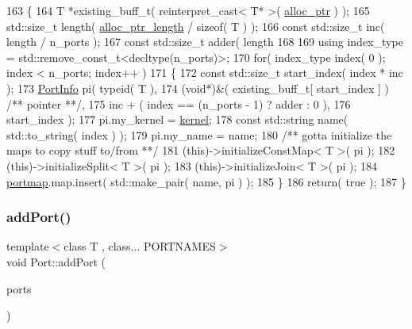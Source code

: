 \begin{DoxyCode}
163    \{
164       T *existing\_buff\_t( reinterpret\_cast< T* >( \hyperlink{class_port_a78bf16e68f1dd5312f37b4e2806a9cf8}{alloc\_ptr} ) );
165       std::size\_t length( \hyperlink{class_port_a98d2e7e0e570e082465c692083300fa9}{alloc\_ptr\_length} / \textcolor{keyword}{sizeof}( T ) );
166       \textcolor{keyword}{const} std::size\_t inc( length / n\_ports );
167       \textcolor{keyword}{const} std::size\_t adder( length %
168 
169       \textcolor{keyword}{using} index\_type = std::remove\_const\_t<decltype(n\_ports)>;
170       \textcolor{keywordflow}{for}( index\_type index( 0 ); index < n\_ports; index++ )
171       \{
172          \textcolor{keyword}{const} std::size\_t start\_index( index * inc );
173          \hyperlink{struct_port_info}{PortInfo} pi( \textcolor{keyword}{typeid}( T ),
174                       (\textcolor{keywordtype}{void}*)&( existing\_buff\_t[ start\_index ] ) \textcolor{comment}{/** pointer **/},
175                       inc + ( index == (n\_ports - 1) ? adder : 0 ),
176                       start\_index );
177          pi.my\_kernel = \hyperlink{class_port_ac17060db235459adaab87cdccb605884}{kernel};
178          \textcolor{keyword}{const} std::string name( std::to\_string( index ) );
179          pi.my\_name   = name;\textcolor{comment}{}
180 \textcolor{comment}{         /** gotta initialize the maps to copy stuff to/from **/}
181          (\textcolor{keyword}{this})->initializeConstMap< T >( pi );
182          (\textcolor{keyword}{this})->initializeSplit<    T >( pi );
183          (\textcolor{keyword}{this})->initializeJoin<     T >( pi );
184          \hyperlink{class_port_a537a8a0c2a47acbf8654f286200aee90}{portmap}.map.insert( std::make\_pair( name, pi ) );
185       \}
186       \textcolor{keywordflow}{return}( \textcolor{keyword}{true} );
187    \}
\end{DoxyCode}
\hypertarget{class_port_a9c1343a48c523fc5b285cb055ba2b53e}{}\label{class_port_a9c1343a48c523fc5b285cb055ba2b53e} 
\subsubsection{\texorpdfstring{add\+Port()}{addPort()}}
{\footnotesize\ttfamily template$<$class T , class... P\+O\+R\+T\+N\+A\+M\+ES$>$ \\
void Port\+::add\+Port (\begin{DoxyParamCaption}\item[{P\+O\+R\+T\+N\+A\+M\+ES \&\&...}]{ports }\end{DoxyParamCaption})\hspace{0.3cm}{\ttfamily [inline]}}

